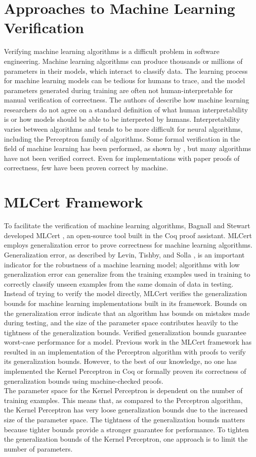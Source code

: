 \section{Approaches to Machine Learning Verification}
Verifying machine learning algorithms is a difficult problem in software engineering. Machine learning algorithms can produce thousands or millions of parameters in their models, which interact to classify data. The learning process for machine learning models can be tedious for humans to trace, and the model parameters generated during training are often not human-interpretable for manual verification of correctness. The authors of \cite{BF16} describe how machine learning researchers do not agree on a standard definition of what human interpretability is or how models should be able to be interpreted by humans. Interpretability varies between algorithms and tends to be more difficult for neural algorithms, including the Perceptron family of algorithms. Some formal verification in the field of machine learning has been performed, as shown by \cite{TD05}, but many algorithms have not been verified correct. Even for implementations with paper proofs of correctness, few have been proven correct by machine.
\section{MLCert Framework}
To facilitate the verification of machine learning algorithms, Bagnall and Stewart developed MLCert \cite{BS19}, an open-source tool built in the Coq proof assistant. MLCert employs generalization error to prove correctness for machine learning algorithms. Generalization error, as described by Levin, Tishby, and Solla \cite{LTS90}, is an important indicator for the robustness of a machine learning model; algorithms with low generalization error can generalize from the training examples used in training to correctly classify unseen examples from the same domain of data in testing. Instead of trying to verify the model directly, MLCert verifies the generalization bounds for machine learning implementations built in its framework. Bounds on the generalization error indicate that an algorithm has bounds on mistakes made during testing, and the size of the parameter space contributes heavily to the tightness of the generalization bounds. Verified generalization bounds guarantee worst-case performance for a model. Previous work in the MLCert framework \cite{BS19} has resulted in an implementation of the Perceptron algorithm with proofs to verify its generalization bounds. However, to the best of our knowledge, no one has implemented the Kernel Perceptron in Coq or formally proven its correctness of generalization bounds using machine-checked proofs.
\\The parameter space for the Kernel Perceptron is dependent on the number of training examples. This means that, as compared to the Perceptron algorithm, the Kernel Perceptron has very loose generalization bounds due to the increased size of the parameter space. The tightness of the generalization bounds matters because tighter bounds provide a stronger guarantee for performance. To tighten the generalization bounds of the Kernel Perceptron, one approach is to limit the number of parameters.
